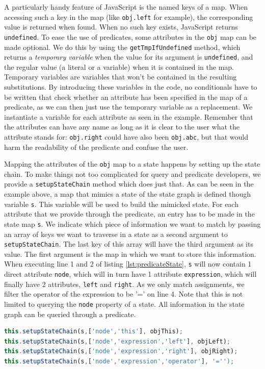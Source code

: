 \noindent A particularly handy feature of JavaScript is the named keys of a map. When accessing such a key in the map (like \texttt{obj.left} for example), the corresponding value is returned when found. When no such key exists, JavaScript returns \texttt{undefined}. To ease the use of predicates, some attributes in the \texttt{obj} map can be made optional. We do this by using the \texttt{getTmpIfUndefined} method, which returns a \textit{temporary variable} when the value for its argument is \texttt{undefined}, and the regular value (a literal or a variable) when it is contained in the map. Temporary variables are variables that won't be contained in the resulting substitutions. By introducing these variables in the code, no conditionals have to be written that check whether an attribute has been specified in the map of a predicate, as we can then just use the temporary variable as a replacement. We instantiate a variable for each attribute as seen in the example. Remember that the attributes can have any name as long as it is clear to the user what the attribute stands for: \texttt{obj.right} could have also been \texttt{obj.abc}, but that would harm the readability of the predicate and confuse the user.

Mapping the attributes of the \texttt{obj} map to a state happens by setting up the state chain. To make things not too complicated for query and predicate developers, we provide a \texttt{setupStateChain} method which does just that. As can be seen in the example above, a map that mimics a state of the state graph is defined though variable \texttt{s}. This variable will be used to build the mimicked state. For each attribute that we provide through the predicate, an entry has to be made in the state map \texttt{s}. We indicate which piece of information we want to match by passing an array of keys we want to traverse in a state as a second argument to \texttt{setupStateChain}. The last key of this array will have the third argument as its value. The first argument is the map in which we want to store this information. When executing line 1 and 2 of listing \ref{lst:predicateState}, \texttt{s} will now contain 1 direct attribute \texttt{node}, which will in turn have 1 attribute \texttt{expression}, which will finally have 2 attributes, \texttt{left} and \texttt{right}. As we only match assignments, we filter the operator of the expression to be '=' on line 4. Note that this is not limited to querying the \texttt{node} property of a state. All information in the state graph can be queried through a predicate.
\begin{lstlisting}[label={lst:predicateState},language=JavaScript, caption=State chain setup of the \texttt{assign} predicate,mathescape=true]
this.setupStateChain(s,['node','this'], objThis);
this.setupStateChain(s,['node','expression','left'], objLeft);
this.setupStateChain(s,['node','expression','right'], objRight); 
this.setupStateChain(s,['node','expression','operator'], '='');
\end{lstlisting}

